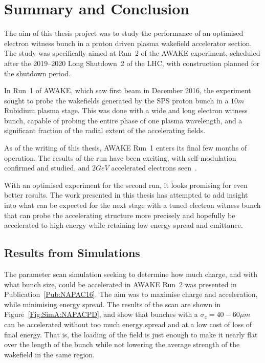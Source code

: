 %
%

\chapter{Summary and Conclusion}
\label{Ch:SnC}

The aim of this thesis project was to study the performance of an optimised electron witness bunch in a proton driven plasma wakefield accelerator section.
The study was specifically aimed at Run~2 of the AWAKE experiment, scheduled after the 2019--2020 Long Shutdown~2 of the LHC, with construction planned for the shutdown period.

In Run~1 of AWAKE, which saw first beam in December 2016, the experiment sought to probe the wakefields generated by the SPS proton bunch in a $10\unit{m}$ Rubidium plasma stage.
This was done with a wide and long electron witness bunch, capable of probing the entire phase of one plasma wavelength, and a significant fraction of the radial extent of the accelerating fields.

As of the writing of this thesis, AWAKE Run~1 enters its final few months of operation.
The results of the run have been exciting, with self-modulation confirmed and studied, and $2\unit{GeV}$ accelerated electrons seen~\cite{adli:2018}.

With an optimised experiment for the second run, it looks promising for even better results.
The work presented in this thesis has attempted to add insight into what can be expected for the next stage with a tuned electron witness bunch that can probe the accelerating structure more precisely and hopefully be accelerated to high energy while retaining low energy spread and emittance.

\section{Results from Simulations}
\label{Sum:Sim}

The parameter scan simulation seeking to determine how much charge, and with what bunch size, could be accelerated in AWAKE Run~2 was presented in Publication~\ref{Pub:NAPAC16}.
The aim was to maximise charge and acceleration, while minimising energy spread.
The results of the scan are shown in Figure~\ref{Fig:SimA:NAPACPD}, and show that bunches with a $\sigma_z = 40-60\unit{\mu m}$ can be accelerated without too much energy spread and at a low cost of loss of final energy.
That is, the loading of the field is just enough to make it nearly flat over the length of the bunch while not lowering the average strength of the wakefield in the same region.

